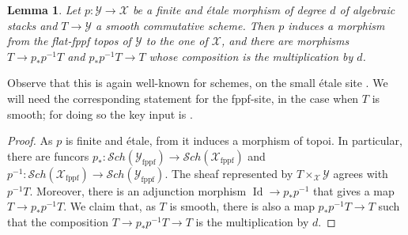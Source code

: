 \documentclass{amsart}
\newtheorem{lemma}[lemma]{Lemma}
\theoremstyle{definition}
\newcommand{\cX}{\mathcal{X}}
\newcommand{\cY}{\mathcal{Y}}
\newcommand{\cS}{\mathcal{S}}
\newcommand{\fppf}{\operatorname{fppf}}
\begin{document}
\begin{lemma}\label{lemma_p_fet_induces_the_trace_map_on_fppf}
    Let $p:\cY\to \cX$ be a finite and \'etale morphism of degree $d$ of algebraic stacks and $T\to \cY$ a smooth commutative scheme. Then $p$ induces a morphism from the flat-fppf topos of $\cY$ to the one of $\cX$, and there are morphisms $T\to p_*p^{-1}T$ and $p_*p^{-1}T\to T$ whose composition is the multiplication by $d$.
\end{lemma}
Observe that this is again well-known for schemes, on the small \'etale site \cite[\href{https://stacks.math.columbia.edu/tag/03SH}{Tag 03SH}]{stacks-project}. We will need the corresponding statement for the fppf-site, in the case when $T$ is smooth; for doing so the key input is \cite[Theorem 11.7]{MR244270}. 
\begin{proof}
     As $p$ is finite and \'etale, from \cite[\href{https://stacks.math.columbia.edu/tag/0GR1}{Tag 0GR1}]{stacks-project} it induces a morphism of topoi. In particular, there are funcors $p_*:\cS ch(\cY_{\fppf})\to \cS ch(\cX_{\fppf})$ and $p^{-1}:\cS ch(\cX_{\fppf})\to \cS ch(\cY_{\fppf})$.
 The sheaf represented by $T\times_{\cX}\cY$ agrees with $p^{-1}T$. Moreover, there is an adjunction morphism $\operatorname{Id} \to p_*p^{-1}$ that gives a map $T\to p_*p^{-1}T$. We claim that, as $T$ is smooth, there is also a map $p_*p^{-1}T\to T$ such that the composition $T\to p_*p^{-1}T\to T$ is the multiplication by $d$. 


\end{proof}
\end{document}
